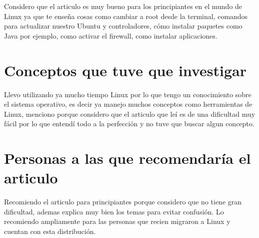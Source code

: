 \documentclass[11pt, a4paper]{report}
\begin{document}
Considero que el articulo es muy bueno para los principiantes en el mundo de
Linux ya que te enseña cosas como cambiar a root desde la terminal, comandos
para actualizar nuestro Ubuntu y controladores, cómo instalar paquetes como Java
por ejemplo, como activar el firewall, como instalar aplicaciones.

\section*{Conceptos que tuve que investigar}
Llevo utilizando ya mucho tiempo Linux por lo que tengo un conocimiento sobre el
sistema operativo, es decir ya manejo muchos conceptos como herramientas de
Linux, menciono porque considero que el articulo que leí es de una dificultad
muy fácil por lo que entendí todo a la perfección y no tuve que buscar algun
concepto.

\section*{Personas a las que recomendaría el articulo}
Recomiendo el articulo para principiantes porque considero que no tiene gran
dificultad, ademas explica muy bien los temas para evitar confusión. Lo
recomiendo ampliamente para las personas que recien migraron a Linux y cuentan
con esta distribución.
\end{document}
